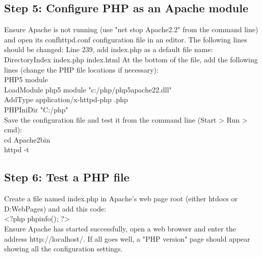 \subsection*{Step 5: Configure PHP as an Apache module}
Ensure Apache is not running (use "net stop Apache2.2" from the command line) and open its confhttpd.conf configuration file in an editor. The following lines should be changed:
Line 239, add index.php as a default file name:\\
DirectoryIndex index.php index.html
At the bottom of the file, add the following lines (change the PHP file locations if necessary):\\
PHP5 module\\
LoadModule php5 module "c:/php/php5apache2\textunderscore2.dll"\\
AddType application/x-httpd-php .php\\
PHPIniDir "C:/php"\\
Save the configuration file and test it from the command line (Start > Run > cmd):\\
cd Apache2bin \\
httpd -t
\subsection*{Step 6: Test a PHP file}
Create a file named index.php in Apache's web page root (either htdocs or D:WebPages) and add this code:\\
<?php phpinfo(); ?>\\
Ensure Apache has started successfully, open a web browser and enter the address http://localhost/. If all goes well, a "PHP version" page should appear showing all the configuration settings.


